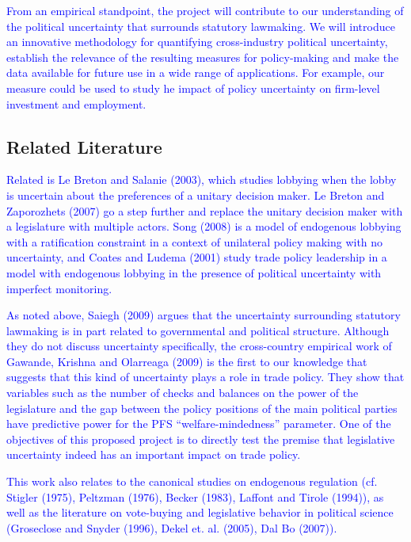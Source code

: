 \documentclass[12pt]{article}
\begin{document}
\textcolor{blue}{From an empirical standpoint, the project will contribute to our understanding of the political uncertainty that surrounds statutory lawmaking. We will introduce an innovative methodology for quantifying cross-industry political uncertainty, establish the relevance of the resulting measures for policy-making and make the data available for future use in a wide range of applications. For example, our measure could be used to study he impact of policy uncertainty on firm-level investment and employment.}

\subsection{Related Literature}
\label{sec:lit}

\textcolor{blue}{Related is Le Breton and Salanie (2003), which studies lobbying when the lobby is uncertain about the preferences of a unitary decision maker. Le Breton and Zaporozhets (2007) go a step further and replace the unitary decision maker with a legislature with multiple actors. Song (2008) is a model of endogenous lobbying with a ratification constraint in a context of unilateral policy making with no uncertainty, and Coates and Ludema (2001) study trade policy leadership in a model with endogenous lobbying in the presence of political uncertainty with imperfect monitoring.}

\textcolor{blue}{As noted above, Saiegh (2009) argues that the uncertainty surrounding statutory lawmaking is in part related to governmental and political structure. Although they do not discuss uncertainty specifically, the cross-country empirical work of Gawande, Krishna and Olarreaga (2009) is the first to our knowledge that suggests that this kind of uncertainty plays a role in trade policy. They show that variables such as the number of checks and balances on the power of the legislature and the gap between the policy positions of the main political parties have predictive power for the PFS ``welfare-mindedness'' parameter. One of the objectives of this proposed project is to directly test the premise that legislative uncertainty indeed has an important impact on trade policy.}
			
\textcolor{blue}{This work also relates to the canonical studies on endogenous regulation (cf. Stigler (1975), Peltzman (1976), Becker (1983), Laffont and Tirole (1994)), as well as the literature on vote-buying and legislative behavior in political science (Groseclose and Snyder (1996), Dekel et. al. (2005), Dal Bo (2007)).}
\end{document}
